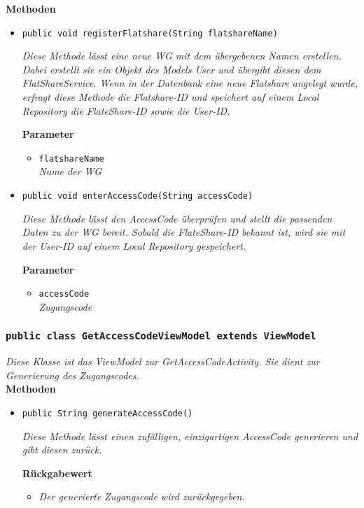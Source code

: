 		\textbf{Methoden}
 			\begin{itemize}
        		\item{\texttt{public void registerFlatshare(String flatshareName)}}
        	
        		\textit{Diese Methode lässt eine neue WG mit dem übergebenen Namen erstellen. Dabei erstellt sie ein Objekt des Models User und übergibt diesen dem FlatShareService. Wenn in der Datenbank eine neue Flatshare angelegt wurde, erfragt diese Methode die Flatshare-ID und speichert auf einem Local Repository die FlateShare-ID sowie die User-ID.}
        
        \textbf{Parameter}
        		\begin{itemize}
        			\item\texttt{flatshareName}\\ 
        			\textit{Name der WG}
        		\end{itemize}
        	
        		\item{\texttt{public void enterAccessCode(String accessCode)}}
        	
        		\textit{Diese Methode lässt den AccessCode überprüfen und stellt die passenden Daten zu der WG bereit. Sobald die FlateShare-ID bekannt ist, wird sie mit der User-ID auf einem Local Repository gespeichert.}
        	
        		\textbf{Parameter}
        		\begin{itemize}
        			\item\texttt{accessCode}\\
        			\textit{Zugangscode}
        		\end{itemize}
        	
        \end{itemize}
   
   
   
             		\subsubsection{\texttt{public class GetAccessCodeViewModel extends ViewModel}}
        \textit{Diese Klasse ist das ViewModel zur GetAccessCodeActivity. Sie dient zur Generierung des Zugangscodes.}\\
        
		\textbf{Methoden}
 			\begin{itemize}
        		\item{\texttt{public String generateAccessCode()}}
        	
        		\textit{Diese Methode lässt einen zufälligen, einzigartigen AccessCode generieren und gibt diesen zurück.}
        	
        \textbf{Rückgabewert}
        	\begin{itemize}
        		\item\textit{Der generierte Zugangscode wird zurückgegeben.}
        	\end{itemize}
        
        
  	  \end{itemize}
       		 
